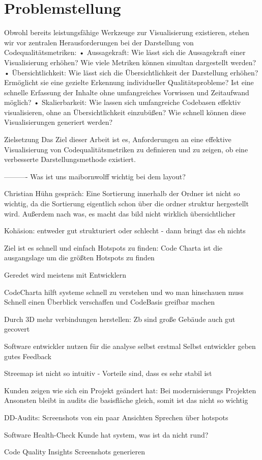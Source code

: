 \section{Problemstellung} \label{sec:Problemstellung}

Obwohl bereits leistungsfähige Werkzeuge zur Visualisierung existieren, stehen wir vor
zentralen Herausforderungen bei der Darstellung von Codequalitätsmetriken:
• Aussagekraft: Wie lässt sich die Aussagekraft einer Visualisierung erhöhen? Wie
viele Metriken können simultan dargestellt werden?
• Übersichtlichkeit: Wie lässt sich die Übersichtlichkeit der Darstellung erhöhen?
Ermöglicht sie eine gezielte Erkennung individueller Qualitätsprobleme? Ist eine
schnelle Erfassung der Inhalte ohne umfangreiches Vorwissen und Zeitaufwand
möglich?
• Skalierbarkeit: Wie lassen sich umfangreiche Codebasen effektiv visualisieren,
ohne an Übersichtlichkeit einzubüßen? Wie schnell können diese
Visualisierungen generiert werden?

Zielsetzung
Das Ziel dieser Arbeit ist es, Anforderungen an eine effektive Visualisierung von
Codequalitätsmetriken zu definieren und zu zeigen, ob eine verbesserte
Darstellungsmethode existiert.



----------
Was ist uns maibornwolff wichtig bei dem layout?


Christian Hühn gespräch:
Eine Sortierung innerhalb der Ordner ist nicht so wichtig, da die Sortierung eigentlich schon über die ordner struktur hergestellt wird. Außerdem nach was, es macht das bild nicht wirklich übersichtlicher

Kohäsion: entweder gut strukturiert oder schlecht - dann bringt das eh nichts



Ziel ist es schnell und einfach Hotspots zu finden:
Code Charta ist die ausgangslage um die größten Hotspots zu finden

Geredet wird meistens mit Entwicklern

CodeCharta hilft systeme schnell zu verstehen und wo man hinschauen muss
Schnell einen Überblick verschaffen und CodeBasis greifbar machen

Durch 3D mehr verbindungen herstellen: Zb sind große Gebäude auch gut gecovert



Software entwickler nutzen für die analyse selbst erstmal 
Selbst entwickler geben gutes Feedback


Streemap ist nicht so intuitiv - Vorteile sind, dass es sehr stabil ist




Kunden zeigen wie sich ein Projekt geändert hat:
Bei modernisierungs Projekten 
Ansonsten bleibt in audits die basisfläche gleich, somit ist das nicht so wichtig

DD-Audits: 
Screenshots von ein paar Ansichten
Sprechen über hotspots

Software Health-Check
Kunde hat system, was ist da nicht rund?

Code Quality Insights
Screenshots generieren